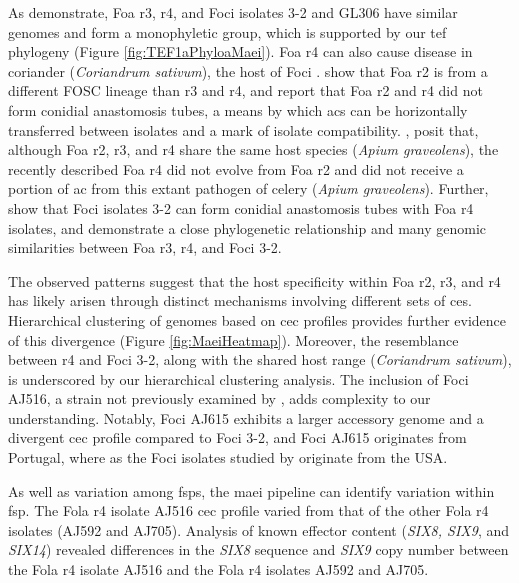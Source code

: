As \textcite{Henry2020} demonstrate, \ac{Foa} \ac{r3}, \ac{r4}, and \ac{Foci} isolates 3-2 and GL306 have similar genomes and form a monophyletic group, which is supported by our \ac{tef} phylogeny (Figure \ref{fig:TEF1aPhyloaMaei}). \ac{Foa} \ac{r4} can also cause disease in coriander (\textit{Coriandrum sativum}), the host of \ac{Foci} \parencite{Epstein2022}. \textcite{Henry2020, Epstein2022} show that \ac{Foa} \ac{r2} is from a different \ac{FOSC} lineage than \ac{r3} and \ac{r4}, and report that \ac{Foa} \ac{r2} and \ac{r4} did not form conidial anastomosis tubes, a means by which \acp{ac} can be horizontally transferred between isolates and a mark of isolate compatibility. \textcite{Epstein2022}, posit that, although \ac{Foa} \ac{r2}, \ac{r3}, and \ac{r4} share the same host species (\textit{Apium graveolens}), the recently described \ac{Foa} \ac{r4} did not evolve from \ac{Foa} \ac{r2} and did not receive a portion of \ac{ac} from this extant pathogen of celery (\textit{Apium graveolens}). Further, \textcite{Epstein2022} show that \ac{Foci} isolates 3-2 can form conidial anastomosis tubes with \ac{Foa} \ac{r4} isolates, and \textcite{Henry2020} demonstrate a close phylogenetic relationship and many genomic similarities between \ac{Foa} \ac{r3}, \ac{r4}, and \ac{Foci} 3-2. 

The observed patterns suggest that the host specificity within \ac{Foa} \ac{r2}, \ac{r3}, and \ac{r4} has likely arisen through distinct mechanisms involving different sets of \acp{ce}. Hierarchical clustering of genomes based on \ac{cec} profiles provides further evidence of this divergence (Figure \ref{fig:MaeiHeatmap}). Moreover, the resemblance between \ac{r4} and \ac{Foci} 3-2, along with the shared host range (\textit{Coriandrum sativum}), is underscored by our hierarchical clustering analysis. The inclusion of \ac{Foci} AJ516, a strain not previously examined by \textcite{Henry2020, Epstein2022}, adds complexity to our understanding. Notably, \ac{Foci} AJ615 exhibits a larger accessory genome and a divergent \ac{cec} profile compared to \ac{Foci} 3-2, and \ac{Foci} AJ615 originates from Portugal, where as the \ac{Foci} isolates studied by \textcite{Henry2020, Epstein2022} originate from the USA. 

As well as variation among \acp{fsp}, the \ac{maei} pipeline can identify variation within \ac{fsp}. The \ac{Fola} \ac{r4} isolate AJ516 \ac{cec} profile varied from that of the other \ac{Fola} \ac{r4} isolates (AJ592 and AJ705). Analysis of known effector content (\textit{SIX8, SIX9}, and \textit{SIX14}) revealed differences in the \textit{SIX8} sequence and \textit{SIX9} copy number between the \ac{Fola} \ac{r4} isolate AJ516 and the \ac{Fola} \ac{r4} isolates AJ592 and AJ705. 

